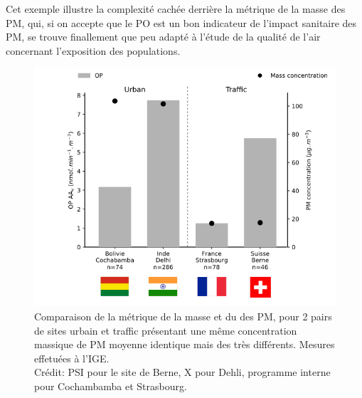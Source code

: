 Cet exemple illustre la complexité cachée derrière la métrique de la masse des PM, qui,
si on accepte que le PO est un bon indicateur de l'impact sanitaire des PM, se trouve
finallement que peu adapté à l'étude de la qualité de l'air concernant l'exposition des
populations.

\begin{figure}[ht!]
    \centering
    \includegraphics[width=0.7\linewidth]{figures/chapter04/OPAAv_4sites.png}
    \caption{Comparaison de la métrique de la masse et du \POAAv{} des PM, pour 2 pairs
        de sites urbain et traffic présentant une même concentration massique de PM
        moyenne identique mais des \POAAv{} très différents. Mesures effetuées à l'IGE.\\
        Crédit: PSI pour le site de Berne, X pour Dehli, programme interne pour
        Cochambamba et Strasbourg.
    }%
    \label{fig:OPAAv_4sites}
\end{figure}


